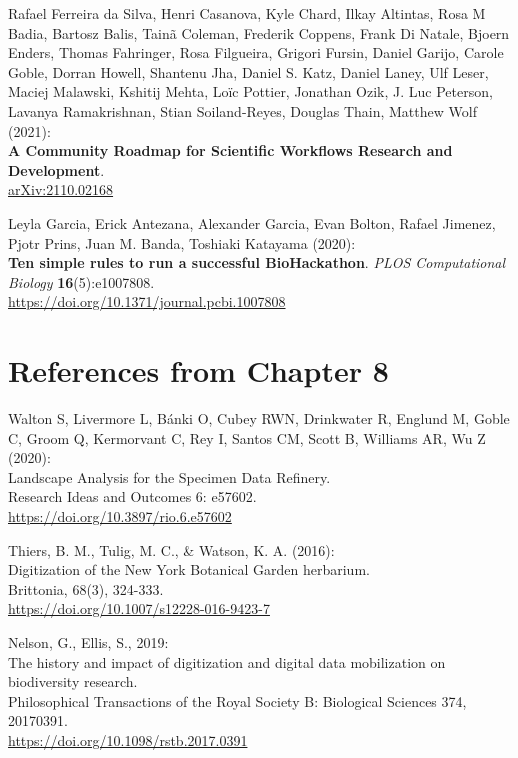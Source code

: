 \begin{thebibliography}{9}
Rafael Ferreira da Silva, Henri Casanova, Kyle Chard, Ilkay
Altintas, Rosa M Badia, Bartosz Balis, Tainã Coleman, Frederik Coppens,
Frank Di Natale, Bjoern Enders, Thomas Fahringer, Rosa Filgueira,
Grigori Fursin, Daniel Garijo, Carole Goble, Dorran Howell, Shantenu
Jha, Daniel S. Katz, Daniel Laney, Ulf Leser, Maciej Malawski, Kshitij
Mehta, Loïc Pottier, Jonathan Ozik, J. Luc Peterson, Lavanya
Ramakrishnan, Stian Soiland-Reyes, Douglas Thain, Matthew Wolf (2021):\\
\textbf{A Community Roadmap for Scientific Workflows Research and
Development}.\\
\href{https://arxiv.org/abs/2110.02168}{arXiv:2110.02168} 

Leyla Garcia, Erick Antezana, Alexander Garcia, Evan Bolton,
Rafael Jimenez, Pjotr Prins, Juan M. Banda, Toshiaki Katayama (2020):\\
\textbf{Ten simple rules to run a successful BioHackathon}. \emph{PLOS
Computational Biology} \textbf{16}(5):e1007808.\\
\url{https://doi.org/10.1371/journal.pcbi.1007808}


\section{References from Chapter 8}

Walton S, Livermore L, Bánki O, Cubey RWN, Drinkwater R, Englund
M, Goble C, Groom Q, Kermorvant C, Rey I, Santos CM, Scott B, Williams
AR, Wu Z (2020):\\
Landscape Analysis for the Specimen Data Refinery.\\
Research Ideas and Outcomes 6: e57602.\\
\url{https://doi.org/10.3897/rio.6.e57602}

Thiers, B. M., Tulig, M. C., \& Watson, K. A. (2016):\\
Digitization of the New York Botanical Garden herbarium.\\
Brittonia, 68(3), 324-333.\\
\url{https://doi.org/10.1007/s12228-016-9423-7}

Nelson, G., Ellis, S., 2019:\\
The history and impact of digitization and digital data mobilization on
biodiversity research.\\
Philosophical Transactions of the Royal Society B: Biological Sciences
374, 20170391.\\
\url{https://doi.org/10.1098/rstb.2017.0391}


\end{thebibliography}

